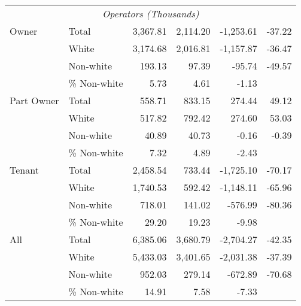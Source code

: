 \begin{tabular}{llrrrr}
\multicolumn{6}{c}{\textit{Operators (Thousands)}} \\
[.5em]
Owner & Total & 3,367.81 & 2,114.20 & -1,253.61 & -37.22 \\
 & White & 3,174.68 & 2,016.81 & -1,157.87 & -36.47 \\
 & Non-white & 193.13 & 97.39 & -95.74 & -49.57 \\
 & \% Non-white & 5.73 & 4.61 & -1.13 &  \\
[1em]
Part Owner & Total & 558.71 & 833.15 & 274.44 & 49.12 \\
 & White & 517.82 & 792.42 & 274.60 & 53.03 \\
 & Non-white & 40.89 & 40.73 & -0.16 & -0.39 \\
 & \% Non-white & 7.32 & 4.89 & -2.43 &  \\
[1em]
Tenant & Total & 2,458.54 & 733.44 & -1,725.10 & -70.17 \\
 & White & 1,740.53 & 592.42 & -1,148.11 & -65.96 \\
 & Non-white & 718.01 & 141.02 & -576.99 & -80.36 \\
 & \% Non-white & 29.20 & 19.23 & -9.98 & \\
[1em]
All & Total & 6,385.06 & 3,680.79 & -2,704.27 & -42.35 \\
 & White & 5,433.03 & 3,401.65 & -2,031.38 & -37.39 \\
 & Non-white & 952.03 & 279.14 & -672.89 & -70.68 \\
 & \% Non-white & 14.91 & 7.58 & -7.33 &  \\
\hline \hline
\end{tabular}

